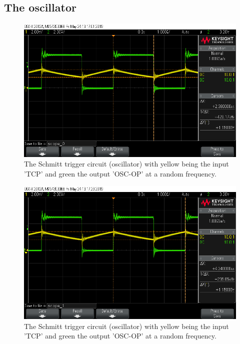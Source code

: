 \subsection{The oscillator}


\begin{figure}[H]
\centering
\includegraphics[width=.9\textwidth]{figures/scope_0.png}
\caption{The Schmitt trigger circuit (oscillator) with yellow being the input 'TCP' and green the output 'OSC-OP' at a random frequency.}
\label{fig:scope_0}
\end{figure}


\begin{figure}[H]
\centering
\includegraphics[width=.9\textwidth]{figures/scope_1.png}
\caption{The Schmitt trigger circuit (oscillator) with yellow being the input 'TCP' and green the output 'OSC-OP' at a random frequency.}
\label{fig:scope_1}
\end{figure}


